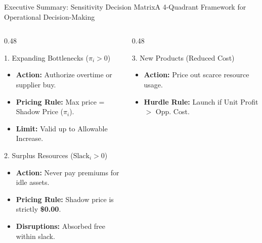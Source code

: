 \documentclass{beamer}
\begin{document}
\begin{frame}{Executive Summary: Sensitivity Decision Matrix}{A 4-Quadrant Framework for Operational Decision-Making}
    \begin{columns}[T]
        \begin{column}{0.48\textwidth}
            \begin{alertblock}{1. Expanding Bottlenecks ($\pi_i > 0$)}
                \scriptsize
                \begin{itemize}\setlength{\itemsep}{0.1em}
                    \item \textbf{Action:} Authorize overtime or supplier buy.
                    \item \textbf{Pricing Rule:} Max price = Shadow Price ($\pi_i$).
                    \item \textbf{Limit:} Valid up to Allowable Increase.
                \end{itemize}
            \end{alertblock}
            \vspace{0.1em}
            \begin{block}{2. Surplus Resources ($\text{Slack}_i > 0$)}
                \scriptsize
                \begin{itemize}\setlength{\itemsep}{0.1em}
                    \item \textbf{Action:} Never pay premiums for idle assets.
                    \item \textbf{Pricing Rule:} Shadow price is strictly \textbf{\$0.00}.
                    \item \textbf{Disruptions:} Absorbed free within slack.
                \end{itemize}
            \end{block}
        \end{column}
        \begin{column}{0.48\textwidth}
            \begin{exampleblock}{3. New Products (Reduced Cost)}
                \scriptsize
                \begin{itemize}\setlength{\itemsep}{0.1em}
                    \item \textbf{Action:} Price out scarce resource usage.
                    \item \textbf{Hurdle Rule:} Launch if Unit Profit $>$ Opp. Cost.

\end{itemize}
\end{exampleblock}
\end{column}
\end{columns}
\end{frame}
\end{document}
